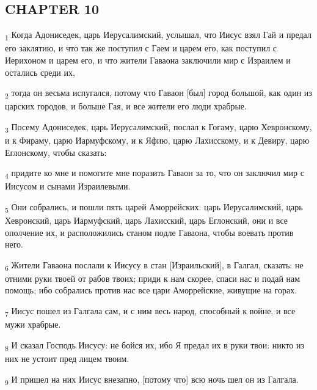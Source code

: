 \subsection{CHAPTER 10}
\begin{tcolorbox}
\textsubscript{1} Когда Адониседек, царь Иерусалимский, услышал, что Иисус взял Гай и предал его заклятию, и что так же поступил с Гаем и царем его, как поступил с Иерихоном и царем его, и что жители Гаваона заключили мир с Израилем и остались среди их,
\end{tcolorbox}
\begin{tcolorbox}
\textsubscript{2} тогда он весьма испугался, потому что Гаваон [был] город большой, как один из царских городов, и больше Гая, и все жители его люди храбрые.
\end{tcolorbox}
\begin{tcolorbox}
\textsubscript{3} Посему Адониседек, царь Иерусалимский, послал к Гогаму, царю Хевронскому, и к Фираму, царю Иармуфскому, и к Яфию, царю Лахисскому, и к Девиру, царю Еглонскому, чтобы сказать:
\end{tcolorbox}
\begin{tcolorbox}
\textsubscript{4} придите ко мне и помогите мне поразить Гаваон за то, что он заключил мир с Иисусом и сынами Израилевыми.
\end{tcolorbox}
\begin{tcolorbox}
\textsubscript{5} Они собрались, и пошли пять царей Аморрейских: царь Иерусалимский, царь Хевронский, царь Иармуфский, царь Лахисский, царь Еглонский, они и все ополчение их, и расположились станом подле Гаваона, чтобы воевать против него.
\end{tcolorbox}
\begin{tcolorbox}
\textsubscript{6} Жители Гаваона послали к Иисусу в стан [Израильский], в Галгал, сказать: не отними руки твоей от рабов твоих; приди к нам скорее, спаси нас и подай нам помощь; ибо собрались против нас все цари Аморрейские, живущие на горах.
\end{tcolorbox}
\begin{tcolorbox}
\textsubscript{7} Иисус пошел из Галгала сам, и с ним весь народ, способный к войне, и все мужи храбрые.
\end{tcolorbox}
\begin{tcolorbox}
\textsubscript{8} И сказал Господь Иисусу: не бойся их, ибо Я предал их в руки твои: никто из них не устоит пред лицем твоим.
\end{tcolorbox}
\begin{tcolorbox}
\textsubscript{9} И пришел на них Иисус внезапно, [потому что] всю ночь шел он из Галгала.
\end{tcolorbox}

